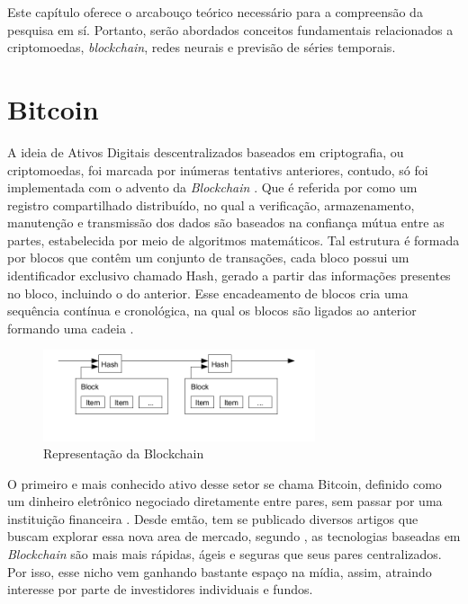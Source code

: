 
Este capítulo oferece o arcabouço teórico necessário para a compreensão da pesquisa em sí. 
Portanto, serão abordados conceitos fundamentais relacionados
a criptomoedas, \textit{blockchain}, redes neurais e previsão de séries temporais.
\section{Bitcoin}
\label{secao:bitcoin}

A ideia de Ativos Digitais descentralizados baseados em criptografia, ou criptomoedas, foi marcada por inúmeras tentativs anteriores, contudo,
só foi implementada com o advento da \textit{Blockchain} \cite{Moi}.
Que é referida por \textcite{Yuan} como um registro compartilhado distribuído, no qual a verificação, armazenamento, manutenção e transmissão dos dados são baseados na confiança mútua entre as partes, estabelecida por meio de algoritmos matemáticos.
Tal estrutura é formada por blocos que contêm um conjunto 
de transações, cada bloco possui um identificador exclusivo chamado Hash,
gerado a partir das informações presentes no bloco, incluindo o do anterior. 
Esse encadeamento de blocos cria uma sequência contínua e cronológica, na qual os blocos são ligados ao anterior formando uma cadeia \cite{Blockchain}.

\begin{figure}[!htb] \centering
  \caption{Representação da Blockchain} \label{figura:imageBlock}
  \begin{varwidth}{\linewidth}
    \includegraphics[width=8cm]{figuras/imageBlock.png}
  \end{varwidth}
\end{figure}

O primeiro e mais conhecido ativo desse setor se chama Bitcoin, definido como um dinheiro eletrônico negociado diretamente entre pares, sem passar por uma instituição financeira \cite{Nakamoto}.
Desde emtão, tem se publicado diversos artigos que buscam explorar essa nova area de mercado, segundo \textcite{Sousa}, as tecnologias baseadas em \textit{Blockchain} são mais mais rápidas, ágeis e seguras que seus pares centralizados. 
Por isso, esse nicho vem ganhando bastante espaço na mídia, assim, atraindo interesse por parte de investidores individuais e fundos. 

